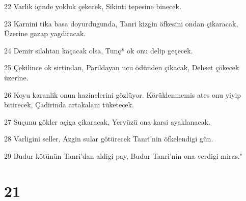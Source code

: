 \par 22 Varlik içinde yokluk çekecek, Sikinti tepesine binecek.
\par 23 Karnini tika basa doyurdugunda, Tanri kizgin öfkesini ondan çikaracak, Üzerine gazap yagdiracak.
\par 24 Demir silahtan kaçacak olsa, Tunç* ok onu delip geçecek.
\par 25 Çekilince ok sirtindan, Parildayan ucu ödünden çikacak, Dehset çökecek üzerine.
\par 26 Koyu karanlik onun hazinelerini gözlüyor. Körüklenmemis ates onu yiyip bitirecek, Çadirinda artakalani tüketecek.
\par 27 Suçunu gökler açiga çikaracak, Yeryüzü ona karsi ayaklanacak.
\par 28 Varligini seller, Azgin sular götürecek Tanri'nin öfkelendigi gün.
\par 29 Budur kötünün Tanri'dan aldigi pay, Budur Tanri'nin ona verdigi miras."

\chapter{21}

